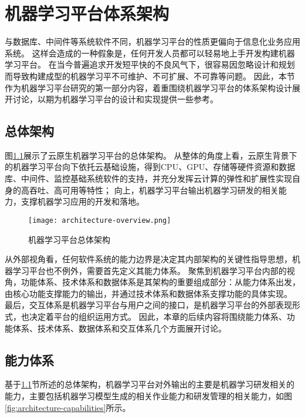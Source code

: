
\chapter{机器学习平台体系架构}
\label{chap:architecture}

与数据库、中间件等系统软件不同，机器学习平台的性质更偏向于信息化业务应用系统。
这样会造成的一种假象是，任何开发人员都可以轻易地上手开发构建机器学习平台。
在当今普遍追求开发短平快的不良风气下，很容易因忽略设计和规划而导致构建成型的机器学习平不可维护、不可扩展、不可靠等问题。
因此，本节作为机器学习平台研究的第一部分内容，着重围绕机器学习平台的体系架构设计展开讨论，以期为机器学习平台的设计和实现提供一些参考。


\section{总体架构}
\label{sec:architecture-overview}

图\ref{fig:architecture-overview}展示了云原生机器学习平台的总体架构。
从整体的角度上看，云原生背景下的机器学习平台向下依托云基础设施，得到CPU、GPU、存储等硬件资源和数据库、中间件、监控基础系统软件的支持，并充分发挥云计算的弹性和扩展性实现自身的高吞吐、高可用等特性；
向上，机器学习平台输出机器学习研发的相关能力，支撑机器学习应用的开发和落地。

\begin{figure}
  \centering
  \texttt{[image: architecture-overview.png]}
  \caption{机器学习平台总体架构}
  \label{fig:architecture-overview}
\end{figure}

从外部视角看，任何软件系统的能力边界是决定其内部架构的关键性指导思想，机器学习平台也不例外，需要首先定义其能力体系。
聚焦到机器学习平台内部的视角，功能体系、技术体系和数据体系是其架构的重要组成部分：从能力体系出发，由核心功能支撑能力的输出，并通过技术体系和数据体系支撑功能的具体实现。
最后，交互体系是机器学习平台与用户之间的接口，是机器学习平台的外部表现形式，也决定着平台的组织运用方式。
因此，本章的后续内容将围绕能力体系、功能体系、技术体系、数据体系和交互体系几个方面展开讨论。


\section{能力体系}

基于\ref{sec:architecture-overview}节所述的总体架构，机器学习平台对外输出的主要是机器学习研发相关的能力，主要包括机器学习模型生成的相关作业能力和研发管理的相关能力，如图\ref{fig:architecture-capabilities}所示。

